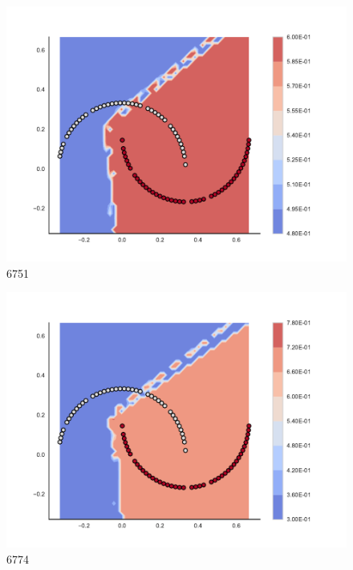 \begin{subfigure}[b]{0.09\textwidth}
    \includegraphics[clip, trim=2.35cm 1.75cm 4.5cm 0cm,width=\textwidth]{img/convergence/6751.pdf}
    \caption{6751}
    \label{fig:convergence_6751}
\end{subfigure}
%
\begin{subfigure}[b]{0.09\textwidth}
    \includegraphics[clip, trim=2.35cm 1.75cm 4.5cm 0cm,width=\textwidth]{img/convergence/6774.pdf}
    \caption{6774}
    \label{fig:convergence_6774}
\end{subfigure}
%
